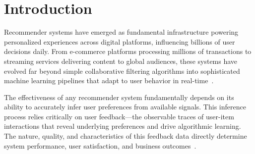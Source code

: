 \section{Introduction}
\label{sec:intro}

Recommender systems have emerged as fundamental infrastructure powering personalized experiences across digital platforms, influencing billions of user decisions daily. From e-commerce platforms processing millions of transactions to streaming services delivering content to global audiences, these systems have evolved far beyond simple collaborative filtering algorithms into sophisticated machine learning pipelines that adapt to user behavior in real-time~\cite{ricci2015recommender,adomavicius2005toward}.

The effectiveness of any recommender system fundamentally depends on its ability to accurately infer user preferences from available signals. This inference process relies critically on user feedback—the observable traces of user-item interactions that reveal underlying preferences and drive algorithmic learning. The nature, quality, and characteristics of this feedback data directly determine system performance, user satisfaction, and business outcomes~\cite{hu2008collaborative,herlocker2004evaluating}.

